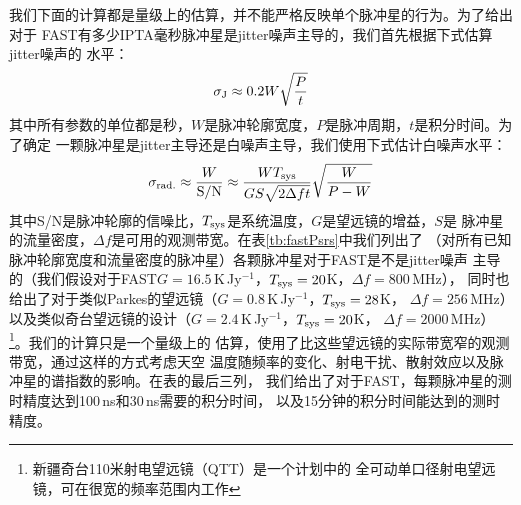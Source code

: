 我们下面的计算都是量级上的估算，并不能严格反映单个脉冲星的行为。为了给出对于
FAST有多少IPTA毫秒脉冲星是jitter噪声主导的，我们首先根据下式估算jitter噪声的
水平\supercite{Shannon12}：
\begin{equation}\label{eqn:jitter}
\sigma_{\rm J} \approx 0.2 W \sqrt{\frac{P}{t}}
\end{equation}
其中所有参数的单位都是秒，$W$是脉冲轮廓宽度，$P$是脉冲周期，$t$是积分时间。为了确定
一颗脉冲星是jitter主导还是白噪声主导，我们使用下式估计白噪声水平：
\begin{equation}
\sigma_{\rm rad.} \approx \frac{W}{\rm S/N} \approx \frac{W T_{\rm sys}}{GS\sqrt{2\Delta ft}}\sqrt{\frac{W}{P-W}}
\end{equation}
其中S/N是脉冲轮廓的信噪比，$T_{\rm sys}$是系统温度，$G$是望远镜的增益，$S$是
脉冲星的流量密度，$\Delta f$是可用的观测带宽。在表\ref{tb:fastPsrs}中我们列出了
（对所有已知脉冲轮廓宽度和流量密度的脉冲星）各颗脉冲星对于FAST是不是jitter噪声
主导的（我们假设对于FAST$G=16.5$\,K\,Jy$^{-1}$，$T_{\rm sys} = 20$K，$\Delta f = 800$\,MHz），
同时也给出了对于类似Parkes的望远镜（$G=0.8$\,K\,Jy$^{-1}$，$T_{\rm sys} = 28$K，
$\Delta f = 256$\,MHz）以及类似奇台望远镜的设计（$G=2.4$\,K\,Jy$^{-1}$，$T_{\rm sys} = 20$K，
$\Delta f = 2000$\,MHz）\footnote{新疆奇台110米射电望远镜（QTT）是一个计划中的
全可动单口径射电望远镜，可在很宽的频率范围内工作}。我们的计算只是一个量级上的
估算，使用了比这些望远镜的实际带宽窄的观测带宽，通过这样的方式考虑天空
温度随频率的变化、射电干扰、散射效应以及脉冲星的谱指数的影响。在表的最后三列，
我们给出了对于FAST，每颗脉冲星的测时精度达到100\,ns和30\,ns需要的积分时间，
以及15分钟的积分时间能达到的测时精度。

